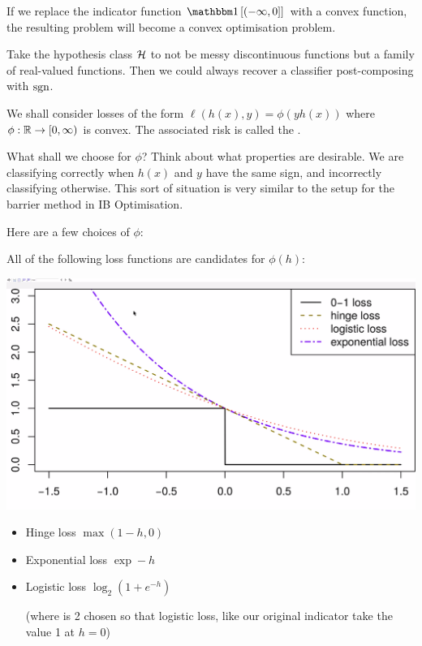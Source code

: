 \documentclass[11pt]{scrartcl}
\begin{document}
If we replace the indicator function $\one{(-\infty, 0]}$ with a convex function, the resulting problem will become a convex optimisation problem.

Take the hypothesis class $\mathcal{H}$ to not be messy discontinuous functions but a family of real-valued functions. Then we could always recover a classifier post-composing with $\text{sgn}$.

We shall consider losses of the form $\ell (h(x), y) = \phi (yh(x))$ where $\phi : \mathbb R \rightarrow [0, \infty)$ is convex. The associated risk is called the . 

What shall we choose for $\phi$? Think about what properties are desirable. We are classifying correctly when $h(x)$ and $y$ have the same sign, and incorrectly classifying otherwise. This sort of situation is very similar to the setup for the barrier method in IB Optimisation.

Here are a few choices of $\phi$:

\begin{example}
All of the following loss functions are candidates for $\phi(h)$:

\begin{center}
\includegraphics[scale=0.25]{surrogates1.png}
\label{surrogates picture}
\end{center}

\begin{itemize}
    \item Hinge loss $\max (1-h, 0)$
    \item Exponential loss $\exp -h  $
    \item Logistic loss $\log_2(1+e^{-h})$ 
    
    (where is 2 chosen so that logistic loss, like our original indicator take the value 1 at $h=0$)
\end{itemize}
\label{surrogates pic}
\end{example}
\end{document}
